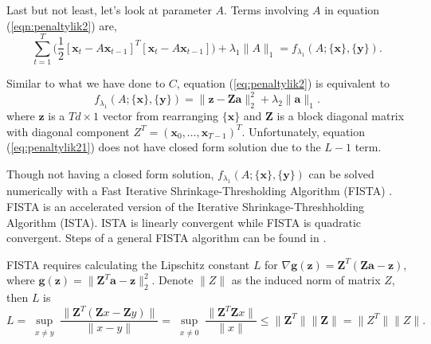 \documentclass[fleqn]{article}
\let\oldref\ref
\renewcommand{\ref}[1]{(\oldref{#1})}
\newcommand{\T}{T}
\begin{document}
Last but not least, let's look at parameter $A$. Terms involving $A$ in equation \ref{eqn:penaltylik2} are,
\begin{equation}\label{eq:penaltylik2}
\sum\limits_{t=1}^{T}\big(\frac{1}{2}[\mathbf{x}_t-A\mathbf{x}_{t-1}]^{\T}[\mathbf{x}_t-A\mathbf{x}_{t-1}]\big)+\lambda_1 \|A\|_1 = f_{\lambda_1}(A;\{\mathbf{x}\},\{\mathbf{y}\}).
\end{equation}

Similar to what we have done to $C$, equation \ref{eq:penaltylik2} is equivalent to
\begin{equation}\label{eq:penaltylik21}
f_{\lambda_1}(A;\{\mathbf{x}\},\{\mathbf{y}\}) =  \|\mathbf{z}  - \mathbf{Za}\|_2^2 + \lambda_2\|\mathbf{a}\|_1.
\end{equation}
where $\mathbf{z}$ is a $Td \times 1$ vector from rearranging $\{\mathbf{x}\}$ and $\mathbf{Z}$ is a block diagonal matrix with diagonal component $Z^{\T} =(\mathbf{x}_0,\ldots,\mathbf{x}_{T-1})^{\T}$. Unfortunately, equation \ref{eq:penaltylik21} does not have closed form solution due to the $L-1$ term.


Though not having a closed form solution, $f_{\lambda_1}(A;\{\mathbf{x}\},\{\mathbf{y}\})$ can be solved numerically with a Fast Iterative Shrinkage-Thresholding Algorithm (FISTA) \cite{beck2009fast} \cite{hoerl1970ridge}. FISTA is an accelerated version of the Iterative Shrinkage-Threshholding Algorithm (ISTA). ISTA is linearly convergent while FISTA is quadratic convergent. Steps of a general FISTA algorithm can be found in .

FISTA requires calculating the Lipschitz constant $L$ for $\nabla\mathbf{g(z)}=\mathbf{Z}^{\T}(\mathbf{Z}\mathbf{a} -\mathbf{z})$, where $\mathbf{g}(\mathbf{z})=\|\mathbf{Z}^{\T}\mathbf{a} -\mathbf{z}\|_2^2$. Denote $\|Z\|$ as the induced norm of matrix $Z$, then $L$ is
\[
L = \sup_{\substack{x\neq y}}\frac{\|\mathbf{Z}^{\T}(\mathbf{Z}x- \mathbf{Z}y)\|}{\|x-y\|}=\sup_{\substack{x\neq 0}}\frac{\|\mathbf{Z}^{\T}\mathbf{Z}x\|}{\|x\|}\leq\|\mathbf{Z}^{\T}\|\|\mathbf{Z}\| = \|Z^{\T}\|\|Z\|.
\]
\end{document}
